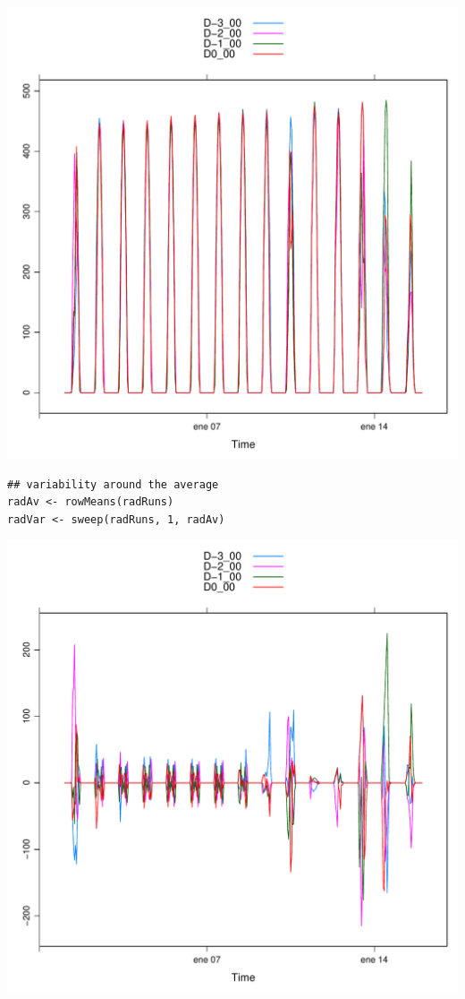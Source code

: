 \documentclass[xcolor={usenames,svgnames,dvipsnames}]{beamer}
\begin{document}
\begin{frame}[label=sec-4-6]{}
\includegraphics[width=.9\linewidth]{figs/radRuns.pdf}
\end{frame}

\begin{frame}[fragile,label=sec-4-7]{}
 \lstset{language=R,label= ,caption= ,numbers=none}
\begin{lstlisting}
## variability around the average
radAv <- rowMeans(radRuns)
radVar <- sweep(radRuns, 1, radAv)
\end{lstlisting}
\end{frame}

\begin{frame}[label=sec-4-8]{}
\includegraphics[width=.9\linewidth]{figs/radVar.pdf}
\end{frame}
\end{document}
